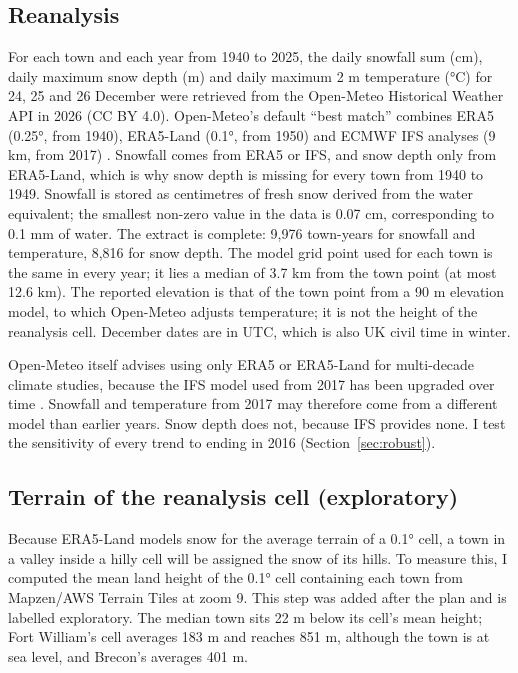 \documentclass[11pt,a4paper]{article}
\begin{document}
\subsection{Reanalysis}
For each town and each year from 1940 to 2025, the daily snowfall sum (cm), daily maximum snow depth (m) and daily maximum 2 m temperature (°C) for 24, 25 and 26 December were retrieved from the Open-Meteo Historical Weather API in 2026 (CC BY 4.0). Open-Meteo's default ``best match'' combines ERA5 (0.25°, from 1940), ERA5-Land (0.1°, from 1950) and ECMWF IFS analyses (9 km, from 2017) \citep{zippenfenig2023}. Snowfall comes from ERA5 or IFS, and snow depth only from ERA5-Land, which is why snow depth is missing for every town from 1940 to 1949. Snowfall is stored as centimetres of fresh snow derived from the water equivalent; the smallest non-zero value in the data is 0.07 cm, corresponding to 0.1 mm of water. The extract is complete: 9,976 town-years for snowfall and temperature, 8,816 for snow depth. The model grid point used for each town is the same in every year; it lies a median of 3.7 km from the town point (at most 12.6 km). The reported elevation is that of the town point from a 90 m elevation model, to which Open-Meteo adjusts temperature; it is not the height of the reanalysis cell. December dates are in UTC, which is also UK civil time in winter.

Open-Meteo itself advises using only ERA5 or ERA5-Land for multi-decade climate studies, because the IFS model used from 2017 has been upgraded over time \citep{zippenfenig2023}. Snowfall and temperature from 2017 may therefore come from a different model than earlier years. Snow depth does not, because IFS provides none. I test the sensitivity of every trend to ending in 2016 (Section~\ref{sec:robust}).

\subsection{Terrain of the reanalysis cell (exploratory)}
Because ERA5-Land models snow for the average terrain of a 0.1° cell, a town in a valley inside a hilly cell will be assigned the snow of its hills. To measure this, I computed the mean land height of the 0.1° cell containing each town from Mapzen/AWS Terrain Tiles at zoom 9. This step was added after the plan and is labelled exploratory. The median town sits 22 m below its cell's mean height; Fort William's cell averages 183 m and reaches 851 m, although the town is at sea level, and Brecon's averages 401 m.
\end{document}
